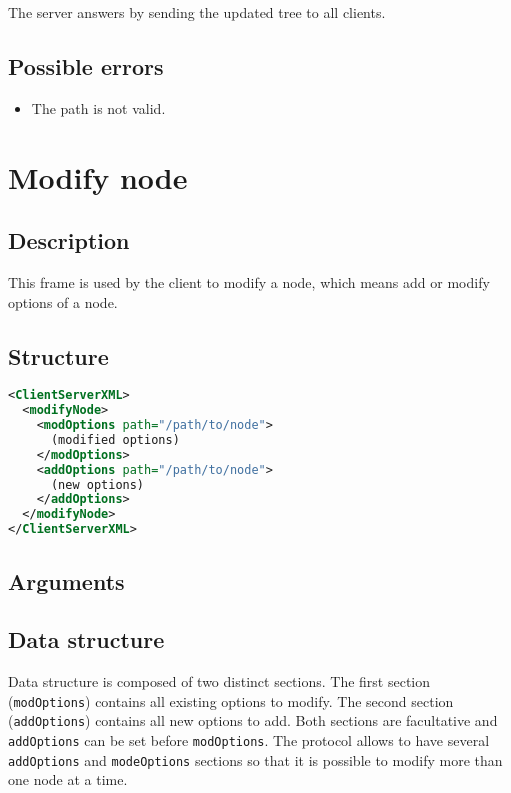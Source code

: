 The server answers by sending the updated tree  to all
clients.

\subsection{Possible errors}

\begin{itemize}
 \item The path is not valid.
\end{itemize}


\section{Modify node}
\label{modifyNode}

\subsection{Description}

This frame is used by the client to modify a node, which means add or modify
options of a node.

\subsection{Structure}

\begin{lstlisting}[language=XML]
<ClientServerXML>
  <modifyNode>
    <modOptions path="/path/to/node">
      (modified options)
    </modOptions>
    <addOptions path="/path/to/node">
      (new options)
    </addOptions>
  </modifyNode>
</ClientServerXML>
\end{lstlisting}

\subsection{Arguments}

\subsection{Data structure}

Data structure is composed of two distinct sections. The first section
(\texttt{modOptions}) contains all existing options to modify. The second
section (\texttt{addOptions}) contains all new options to add. Both sections
are facultative and \texttt{addOptions} can be set before \texttt{modOptions}.
The protocol allows to have several \texttt{addOptions} and
\texttt{modeOptions} sections so that it is possible to modify more than one
node at a time.

